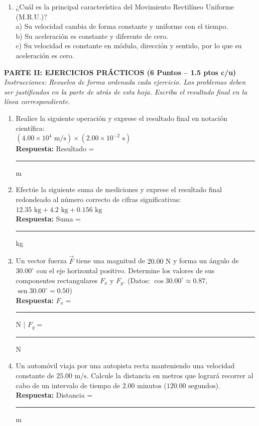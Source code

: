 \documentclass[10pt]{article}
\begin{document}
\begin{enumerate}[leftmargin=*]
    \item ¿Cuál es la principal característica del Movimiento Rectilíneo Uniforme (M.R.U.)? \\
    a) Su velocidad cambia de forma constante y uniforme con el tiempo. \\
    b) Su aceleración es constante y diferente de cero. \\
    c) Su velocidad es constante en módulo, dirección y sentido, por lo que su aceleración es cero.
\end{enumerate}

\vspace{0.3cm}
\noindent \textbf{PARTE II: EJERCICIOS PRÁCTICOS (6 Puntos -- 1.5 ptos c/u)} \\
\textit{Instrucciones: Resuelva de forma ordenada cada ejercicio. Los problemas deben ser justificados en la parte de atrás de esta hoja. Escriba el resultado final en la línea correspondiente.}

\begin{enumerate}[leftmargin=*]
    \item Realice la siguiente operación y exprese el resultado final en notación científica: \\
    $(4.00 \times 10^4\text{ m/s}) \times (2.00 \times 10^{-2}\text{ s})$ \\
    \textbf{Respuesta:} Resultado = \rule{5cm}{0.1pt} m

    \item Efectúe la siguiente suma de mediciones y exprese el resultado final redondeado al número correcto de cifras significativas: \\
    $12.35\text{ kg} + 4.2\text{ kg} + 0.156\text{ kg}$ \\
    \textbf{Respuesta:} Suma = \rule{5cm}{0.1pt} kg

    \item Un vector fuerza $\vec{F}$ tiene una magnitud de $20.00\text{ N}$ y forma un ángulo de $30.00^\circ$ con el eje horizontal positivo. Determine los valores de sus componentes rectangulares $F_x$ y $F_y$. (Datos: $\cos 30.00^\circ \approx 0.87$, $\operatorname{sen} 30.00^\circ = 0.50$) \\
    \textbf{Respuesta:} $F_x = $ \rule{3cm}{0.1pt} N \quad | \quad $F_y = $ \rule{3cm}{0.1pt} N

    \item Un automóvil viaja por una autopista recta manteniendo una velocidad constante de $25.00\text{ m/s}$. Calcule la distancia en metros que logrará recorrer al cabo de un intervalo de tiempo de $2.00\text{ minutos}$ ($120.00\text{ segundos}$). \\
    \textbf{Respuesta:} Distancia = \rule{5cm}{0.1pt} m
\end{enumerate}
\end{document}
